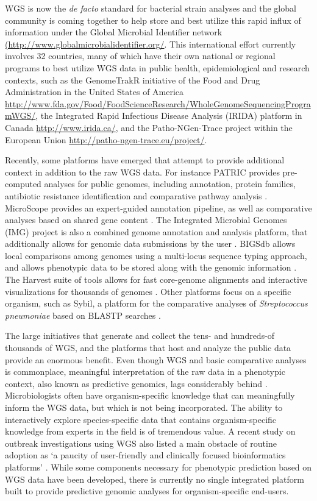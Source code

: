 \documentclass[doublespacing, linenumbers]{bmcart}
\begin{document}
  WGS is now the \textit{de facto} standard for bacterial strain analyses and the global community is coming together to help store and best utilize this rapid influx of information under the Global Microbial Identifier network \url{(http://www.globalmicrobialidentifier.org/}. This international effort currently involves 32 countries, many of which have their own national or regional programs to best utilize WGS data in public health, epidemiological and research contexts, such as the GenomeTrakR initiative of the Food and Drug Administration in the United States of America \url{http://www.fda.gov/Food/FoodScienceResearch/WholeGenomeSequencingProgramWGS/}, the Integrated Rapid Infectious Disease Analysis (IRIDA) platform in Canada \url{http://www.irida.ca/}, and the Patho-NGen-Trace project within the European Union  \url{http://patho-ngen-trace.eu/project/}.

Recently, some platforms have emerged that attempt to provide additional context in addition to the raw WGS data. For instance PATRIC provides pre-computed analyses for public genomes, including annotation, protein families, antibiotic resistance identification and comparative pathway analysis \cite{wattam_patric_2013}.   MicroScope provides an expert-guided annotation pipeline, as well as comparative analyses based on shared gene content
\cite{vallenet_microscope--integrated_2012}. The Integrated Microbial Genomes (IMG) project is also a combined genome annotation and analysis platform, that additionally allows for genomic data submissions by the user \cite{markowitz_img_2013}. BIGSdb allows local comparisons among genomes using a multi-locus sequence typing approach, and allows phenotypic data to be stored along with the genomic information \cite{jolley_bigsdb:_2010}. The Harvest suite of tools allows for fast core-genome alignments and interactive visualizations for thousands of genomes \cite{treangen_rapid_2014}. Other platforms focus on  a specific organism, such as Sybil, a platform for the comparative analyses of \textit{Streptococcus pneumoniae} based on BLASTP searches \cite{riley_using_2012}. 

The large initiatives that generate and collect the tens- and hundreds-of thousands of WGS, and the platforms that host and analyze the public data provide an enormous benefit. Even though WGS and basic comparative analyses is commonplace, meaningful interpretation of the raw data in a phenotypic context, also known as predictive genomics, lags considerably behind \cite{fricke_bacterial_2014}. Microbiologists often have organism-specific knowledge that can meaningfully inform the WGS data, but which is not being incorporated.  The ability to interactively explore species-specific data that contains organism-specific knowledge from experts in the field is of tremendous value. A recent study on outbreak investigations using WGS also listed a main obstacle of routine adoption as `a paucity of user-friendly and clinically focused bioinformatics platforms'  \cite{sherry_outbreak_2013}. While some components necessary for phenotypic prediction based on WGS data have been developed, there is currently no single integrated platform built to provide predictive genomic analyses for organism-specific end-users.
\end{document}
